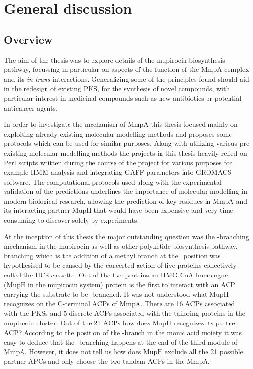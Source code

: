\chapter{General discussion}
\label{cha:chap7}

\section{Overview}
\label{sec:chap7Overview}
	The aim of the thesis was to explore details of the mupirocin biosynthesis pathway, focussing in particular on aspects of the function of the MmpA complex and its \textit{in trans} interactions. Generalizing some of the principles found should aid in the redesign of existing PKS, for the synthesis of novel compounds, with particular interest in medicinal compounds such as new antibiotics or potential anticancer agents. 
	
	In order to investigate the mechanism of MmpA this thesis focused mainly on exploiting already existing molecular modelling methods and proposes some protocols which can be used for similar purposes. Along with utilizing various pre existing molecular modelling methods the projects in this thesis heavily relied on Perl scripts written during the course of the project for various purposes for example HMM analysis and integrating GAFF parameters into GROMACS software. The computational protocols used along with the experimental validation of the predictions underlines the importance of molecular modelling in modern biological research, allowing the prediction of key residues in  MmpA and its interacting partner MupH that would have been expensive and very time consuming to discover solely by experiments. 
	
	At the inception of this thesis the major outstanding question was the \bet-branching mechanism in the mupirocin as well as other polyketide biosynthesis pathway. \bet-branching which is the addition of a methyl branch at the \bet \ position was hypothesised to be caused by the concerted action of five proteins collectively called the HCS cassette. Out of the five proteins an HMG-CoA homologue (MupH in the mupirocin system) protein is the first to interact with an ACP carrying the substrate to be \bet-branched. It was not understood what MupH recognizes on the C-terminal ACPs of MmpA. There are 16 ACPs associated with the PKSs and 5 discrete ACPs associated with the tailoring proteins in the mupirocin cluster. Out of the 21 ACPs how does MupH recognizes its partner ACP?  According to the position of the \bet-branch in the monic acid moiety it was easy to deduce that the \bet-branching happens at the end of the third module of MmpA. However, it does not tell us how does MupH exclude all the 21 possible partner APCs and only choose the two tandem ACPs in the MmpA.
	
